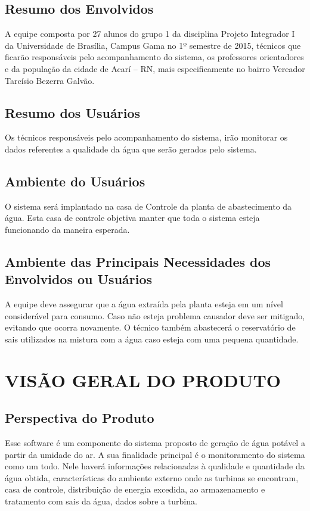 \documentclass[12pt,openright,oneside,a4paper,brazil]{abntex2}
\begin{document}
\subsection*{Resumo dos Envolvidos}
A equipe composta por 27 alunos do grupo 1 da disciplina Projeto Integrador I da Universidade de Brasília, Campus Gama no 1º semestre de 2015, técnicos que ficarão responsáveis pelo acompanhamento do sistema, os professores orientadores e da população da cidade de Acarí – RN, mais especificamente no bairro Vereador Tarcísio Bezerra Galvão.

\subsection*{Resumo dos Usuários}
Os técnicos responsáveis pelo acompanhamento do sistema, irão monitorar os dados referentes a qualidade da água que serão gerados pelo sistema.

\subsection*{Ambiente do Usuários}
O sistema será implantado na casa  de Controle da planta de abastecimento da água. Esta casa de controle objetiva manter que toda o sistema esteja funcionando da maneira esperada.

\subsection*{Ambiente das Principais Necessidades dos Envolvidos ou Usuários}
A equipe deve assegurar que a água extraída pela planta esteja em um nível considerável para consumo. Caso não esteja problema causador deve ser mitigado, evitando que ocorra novamente. O técnico também abastecerá o reservatório de sais utilizados na mistura com a água caso esteja com uma pequena quantidade.

\section*{VISÃO GERAL DO PRODUTO}
\subsection*{Perspectiva do Produto}
Esse software é um componente do sistema proposto de geração de água potável a partir da umidade do ar. A sua finalidade principal é o monitoramento do sistema como um todo. Nele haverá informações relacionadas à qualidade e quantidade da água obtida, características do ambiente externo onde as turbinas se encontram, casa de controle, distribuição de energia excedida, ao armazenamento e tratamento com sais da água, dados sobre a turbina. 
\end{document}
